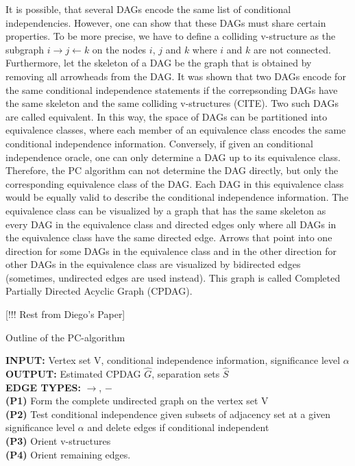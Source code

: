 \documentclass[article]{jss}
\begin{document}
It is possible, that several DAGs encode the same list of conditional
independencies. However, one can show that these DAGs must share certain
properties. To be more precise, we have to define a colliding v-structure
as the subgraph $i \rightarrow j \leftarrow k$ on the nodes $i$, $j$ and
$k$ where $i$ and $k$ are not connected. Furthermore, let the skeleton of a
DAG be the graph that is obtained by removing all arrowheads from the
DAG. It was shown that two DAGs encode for the same conditional
independence statements if the correpsonding DAGs have the same skeleton
and the same colliding v-structures (CITE). Two such DAGs are called
equivalent. In this way, the space of DAGs can be partitioned into
equivalence classes, where each member of an equivalence class encodes the
same conditional independence information. Conversely, if given an
conditional independence oracle, one can only determine a DAG up to its
equivalence class. Therefore, the PC algorithm can not determine the DAG
directly, but only the corresponding equivalence class of the DAG. Each DAG
in this equivalence class would be equally valid to describe the
conditional independence information. The equivalence class can be
visualized by a graph that has the same skeleton as every DAG in the
equivalence class and directed edges only where all DAGs in the equivalence
class have the same directed edge. Arrows that point into one direction
for some DAGs in the equivalence class and in the other direction for other
DAGs in the equivalence class are visualized by bidirected edges
(sometimes, undirected edges are used instead). This graph is called
Completed Partially Directed Acyclic Graph (CPDAG).

[!!! Rest from Diego's Paper]
\begin{algorithm}[h]
\caption{Outline of the PC-algorithm}
\label{pc}
\begin{algorithmic}
\STATE \textbf{INPUT:} Vertex set V, conditional independence information,
significance level $\alpha$\\
\STATE \textbf{OUTPUT:} Estimated CPDAG $\hat{G}$, separation sets $\hat{S}$\\
\STATE \textbf{EDGE TYPES:} $\rightarrow$, $-$\\ 
\STATE \textbf{(P1)} Form the complete undirected graph on the vertex
set V\\
\STATE \textbf{(P2)} Test conditional independence given subsets of
adjacency set at a given significance level $\alpha$ and delete edges if
conditional independent\\ 
\STATE \textbf{(P3)} Orient v-structures\\
\STATE \textbf{(P4)} Orient remaining edges.\\
\end{algorithmic}
\label{algo:pc}
\end{algorithm}
\end{document}
